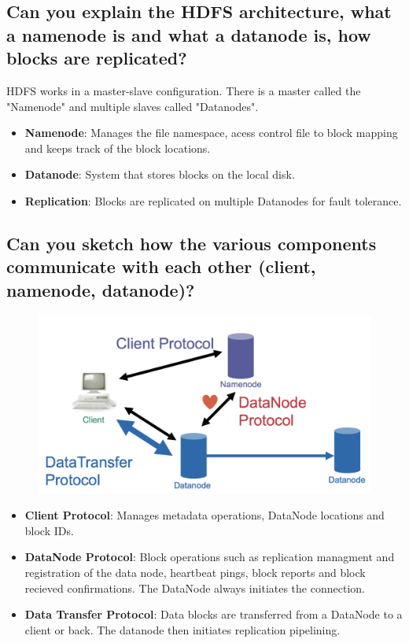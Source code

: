 \documentclass{article}
\begin{document}
\subsection{Can you explain the HDFS architecture, what a namenode is and what a datanode is, how blocks are replicated?}

HDFS works in a master-slave configuration. There is a master called the "Namenode" and multiple slaves called "Datanodes".

\begin{itemize}
    \item \textbf{Namenode}: Manages the file namespace, acess control file to block mapping and keeps track of the block locations.
    \item \textbf{Datanode}: System that stores blocks on the local disk.
    \item \textbf{Replication}: Blocks are replicated on multiple Datanodes for fault tolerance.
\end{itemize}

\subsection{Can you sketch how the various components communicate with each other (client, namenode, datanode)?}

\begin{figure}
    \centering
    \includegraphics[width=0.5\linewidth]{img/hdfsoverview.png}
\end{figure}

\begin{itemize}
    \item \textbf{Client Protocol}: Manages metadata operations, DataNode locations and block IDs.
    \item \textbf{DataNode Protocol}: Block operations such as replication managment and registration of the data node, heartbeat pings, block reports and block recieved confirmations. The DataNode always initiates the connection.
    \item \textbf{Data Transfer Protocol}: Data blocks are transferred from a DataNode to a client or back. The datanode then initiates replication pipelining.
\end{itemize}
\end{document}
